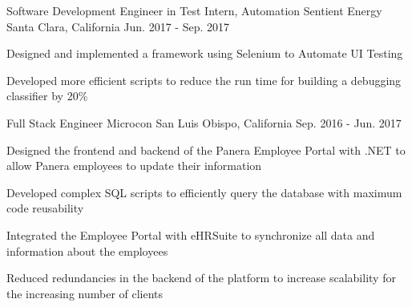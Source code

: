 


\begin{cventries}


\cventry
{Software Development Engineer in Test Intern, Automation} %
{Sentient Energy} %
{Santa Clara, California} %
{Jun. 2017 - Sep. 2017} %
{ %
\begin{cvitems}
\item {Designed and implemented a framework using Selenium to Automate UI Testing}
\item {Developed more efficient scripts to reduce the run time for building a debugging classifier by 20\%}
\end{cvitems}
}


\cventry
{Full Stack Engineer} %
{Microcon} %
{San Luis Obispo, California} %
{Sep. 2016 - Jun. 2017} %
{ %
\begin{cvitems}
\item {Designed the frontend and backend of the Panera Employee Portal with .NET to allow Panera employees to update their information}
\item {Developed complex SQL scripts to efficiently query the database with maximum code reusability}
\item {Integrated the Employee Portal with eHRSuite to synchronize all data and information about the employees}
\item {Reduced redundancies in the backend of the platform to increase scalability for the increasing number of clients}
\end{cvitems}
}




\end{cventries}
